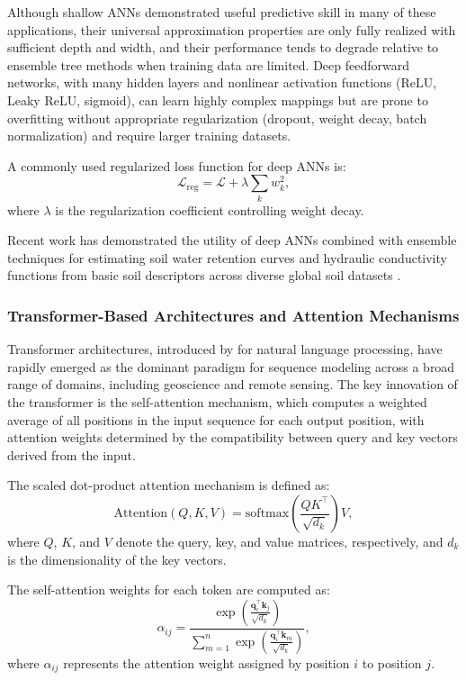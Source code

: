\documentclass[land,review,accept,pdftex,oneauthor]{Definitions/mdpi}
\begin{document}
Although shallow ANNs demonstrated useful predictive skill in many of these applications, their universal approximation properties are only fully realized with sufficient depth and width, and their performance tends to degrade relative to ensemble tree methods when training data are limited. Deep feedforward networks, with many hidden layers and nonlinear activation functions (ReLU, Leaky ReLU, sigmoid), can learn highly complex mappings but are prone to overfitting without appropriate regularization (dropout, weight decay, batch normalization) and require larger training datasets.

A commonly used regularized loss function for deep ANNs is:
\begin{equation}
\mathcal{L}_{\text{reg}}
=
\mathcal{L}
+
\lambda
\sum_{k} w_k^2,
\end{equation}
where $\lambda$ is the regularization coefficient controlling weight decay.

Recent work has demonstrated the utility of deep ANNs combined with ensemble techniques for estimating soil water retention curves and hydraulic conductivity functions from basic soil descriptors across diverse global soil datasets \citep{Lemenkova202403,Lemenkova202410}.

\subsubsection{Transformer-Based Architectures and Attention Mechanisms}

Transformer architectures, introduced by \citet{Vaswani2017} for natural language processing, have rapidly emerged as the dominant paradigm for sequence modeling across a broad range of domains, including geoscience and remote sensing. The key innovation of the transformer is the self-attention mechanism, which computes a weighted average of all positions in the input sequence for each output position, with attention weights determined by the compatibility between query and key vectors derived from the input.

The scaled dot-product attention mechanism is defined as:
\begin{equation}
\text{Attention}(Q,K,V)
=
\text{softmax}
\left(
\frac{QK^\top}{\sqrt{d_k}}
\right)V,
\end{equation}
where $Q$, $K$, and $V$ denote the query, key, and value matrices, respectively, and $d_k$ is the dimensionality of the key vectors.

The self-attention weights for each token are computed as:
\begin{equation}
\alpha_{ij}
=
\frac{
\exp \left(
\frac{\mathbf{q}_i^\top \mathbf{k}_j}{\sqrt{d_k}}
\right)
}{
\sum_{m=1}^{n}
\exp \left(
\frac{\mathbf{q}_i^\top \mathbf{k}_m}{\sqrt{d_k}}
\right)
},
\end{equation}
where $\alpha_{ij}$ represents the attention weight assigned by position $i$ to position $j$.
\end{document}

